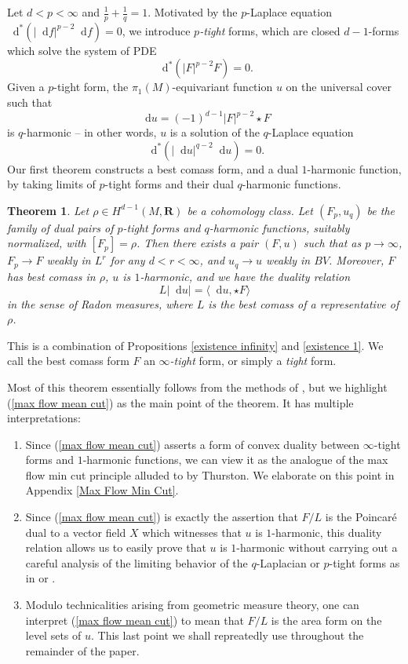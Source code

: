 \documentclass[reqno,11pt]{amsart}
\newcommand{\RR}{\mathbf{R}}
\newcommand*\dif{\mathop{}\!\mathrm{d}}
\newcommand{\dfn}[1]{\emph{#1}\index{#1}}
\newtheorem{mainthm}{Theorem}
\theoremstyle{definition}
\numberwithin{equation}{section}
\begin{document}
Let $d < p < \infty$ and $\frac{1}{p} + \frac{1}{q} = 1$.
Motivated by the $p$-Laplace equation $\dif^*(|\dif f|^{p - 2} \dif f) = 0$, we introduce \dfn{$p$-tight} forms, which are closed $d-1$-forms which solve the system of PDE
$$\dif^*(|F|^{p - 2} F) = 0.$$
Given a $p$-tight form, the $\pi_1(M)$-equivariant function $u$ on the universal cover such that
$$\dif u = (-1)^{d - 1} |F|^{p - 2} \star F$$
is $q$-harmonic -- in other words, $u$ is a solution of the $q$-Laplace equation 
$$\dif^*(|\dif u|^{q - 2} \dif u) = 0.$$
Our first theorem constructs a best comass form, and a dual $1$-harmonic function, by taking limits of $p$-tight forms and their dual $q$-harmonic functions.

\begin{mainthm}\label{existence of infinity tight forms}
Let $\rho \in H^{d - 1}(M, \RR)$ be a cohomology class.
Let $(F_p, u_q)$ be the family of dual pairs of $p$-tight forms and $q$-harmonic functions, suitably normalized, with $[F_p] = \rho$.
Then there exists a pair $(F, u)$ such that as $p \to \infty$, $F_p \to F$ weakly in $L^r$ for any $d < r < \infty$, and $u_q \to u$ weakly in $BV$.
Moreover, $F$ has best comass in $\rho$, $u$ is $1$-harmonic, and we have the duality relation 
\begin{equation}\label{max flow mean cut}
L|\dif u| = \langle \dif u, \star F\rangle
\end{equation}
in the sense of Radon measures, where $L$ is the best comass of a representative of $\rho$.
\end{mainthm}

This is a combination of Propositions \ref{existence infinity} and \ref{existence 1}.
We call the best comass form $F$ an \dfn{$\infty$-tight} form, or simply a \dfn{tight} form.

Most of this theorem essentially follows from the methods of \cite{Mazon14,daskalopoulos2020transverse}, but we highlight (\ref{max flow mean cut}) as the main point of the theorem.
It has multiple interpretations:
\begin{enumerate}
\item Since (\ref{max flow mean cut}) asserts a form of convex duality between $\infty$-tight forms and $1$-harmonic functions, we can view it as the analogue of the max flow min cut principle alluded to by Thurston. We elaborate on this point in Appendix \ref{Max Flow Min Cut}.
\item Since (\ref{max flow mean cut}) is exactly the assertion that $F/L$ is the Poincar\'e dual to a vector field $X$ which witnesses that $u$ is $1$-harmonic, this duality relation allows us to easily prove that $u$ is $1$-harmonic without carrying out a careful analysis of the limiting behavior of the $q$-Laplacian or $p$-tight forms as in \cite[Theorem 2.4]{Mazon14} or \cite[\S6]{daskalopoulos2020transverse}.
\item Modulo technicalities arising from geometric measure theory, one can interpret (\ref{max flow mean cut}) to mean that $F/L$ is the area form on the level sets of $u$. This last point we shall repreatedly use throughout the remainder of the paper.
\end{enumerate}
\end{document}
